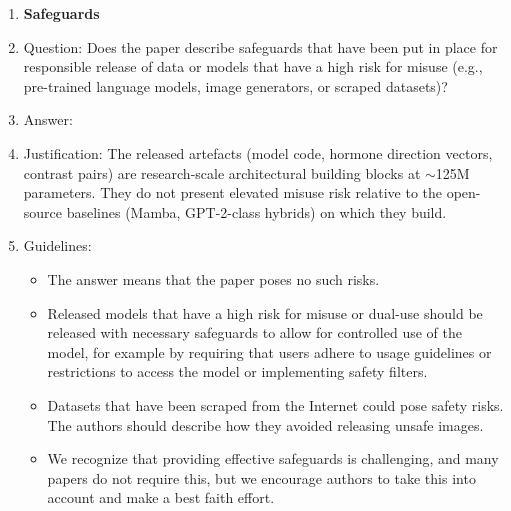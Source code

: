 \begin{enumerate}
\begin{itemize}
        \item The authors should consider possible harms that could arise when the technology is being used as intended and functioning correctly, harms that could arise when the technology is being used as intended but gives incorrect results, and harms following from (intentional or unintentional) misuse of the technology.
        \item If there are negative societal impacts, the authors could also discuss possible mitigation strategies (e.g., gated release of models, providing defenses in addition to attacks, mechanisms for monitoring misuse, mechanisms to monitor how a system learns from feedback over time, improving the efficiency and accessibility of ML).
    \end{itemize}
    
\item {\bf Safeguards}
    \item[] Question: Does the paper describe safeguards that have been put in place for responsible release of data or models that have a high risk for misuse (e.g., pre-trained language models, image generators, or scraped datasets)?
    \item[] Answer: \answerNA{}
    \item[] Justification: The released artefacts (model code, hormone direction vectors, contrast pairs) are research-scale architectural building blocks at $\sim$125M parameters. They do not present elevated misuse risk relative to the open-source baselines (Mamba, GPT-2-class hybrids) on which they build.
    \item[] Guidelines:
    \begin{itemize}
        \item The answer \answerNA{} means that the paper poses no such risks.
        \item Released models that have a high risk for misuse or dual-use should be released with necessary safeguards to allow for controlled use of the model, for example by requiring that users adhere to usage guidelines or restrictions to access the model or implementing safety filters. 
        \item Datasets that have been scraped from the Internet could pose safety risks. The authors should describe how they avoided releasing unsafe images.
        \item We recognize that providing effective safeguards is challenging, and many papers do not require this, but we encourage authors to take this into account and make a best faith effort.
    \end{itemize}


\end{enumerate}
